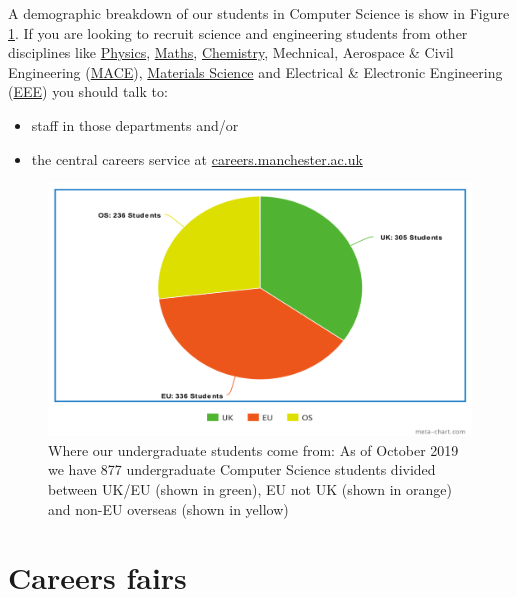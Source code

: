 \documentclass[
  12pt,
]{book}
\providecommand{\tightlist}{%
  \setlength{\itemsep}{0pt}\setlength{\parskip}{0pt}}
\begin{document}
A demographic breakdown of our students in Computer Science is show in Figure \ref{fig:pie-fig}. If you are looking to recruit science and engineering students from other disciplines like \href{https://www.physics.manchester.ac.uk/}{Physics}, \href{https://www.maths.manchester.ac.uk/}{Maths}, \href{https://www.chemistry.manchester.ac.uk/}{Chemistry}, Mechnical, Aerospace \& Civil Engineering (\href{https://www.mace.manchester.ac.uk/}{MACE}), \href{https://www.materials.manchester.ac.uk/}{Materials Science} and Electrical \& Electronic Engineering (\href{https://www.eee.manchester.ac.uk/}{EEE}) you should talk to:

\begin{itemize}
\tightlist
\item
  staff in those departments and/or\\
\item
  the central careers service at \href{http://www.careers.manchester.ac.uk/}{careers.manchester.ac.uk}
\end{itemize}

\begin{figure}

{\centering \includegraphics[width=1\linewidth]{images/ugstudentspiechart} 

}

\caption{Where our undergraduate students come from: As of October 2019 we have 877 undergraduate Computer Science students divided between UK/EU (shown in green), EU not UK (shown in orange) and non-EU overseas (shown in yellow)}\label{fig:pie-fig}
\end{figure}

\hypertarget{careersfairs}{%
\section{Careers fairs}\label{careersfairs}}
\end{document}

